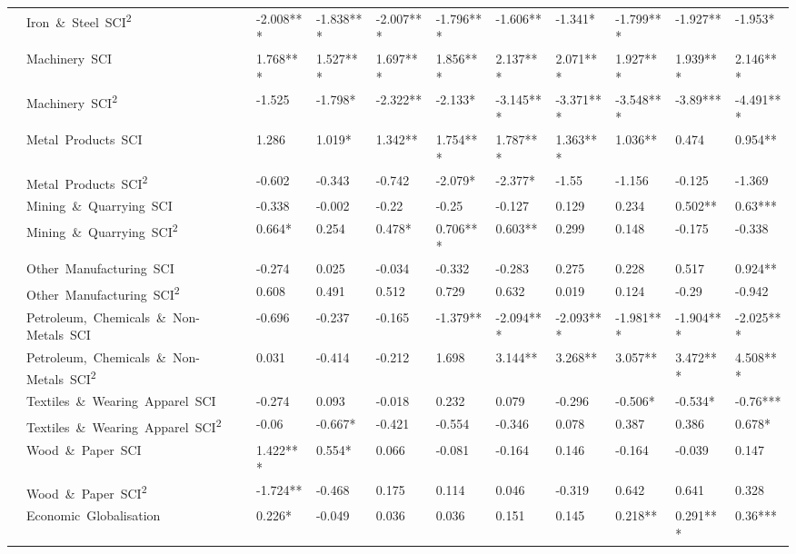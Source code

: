 \documentclass[10pt]{article}
\begin{document}
\begin{table}[ht]
\begin{adjustbox}{width=\textwidth,center}
\begin{tabular}{lllllllllll}
      & Iron\ \&\ Steel\ SCI\textsuperscript{2} & -2.008*** & -1.838*** & -2.007*** & -1.796*** & -1.606** & -1.341* & -1.799*** & -1.927** & -1.953* \\
      & Machinery\ SCI & 1.768*** & 1.527*** & 1.697*** & 1.856*** & 2.137*** & 2.071*** & 1.927*** & 1.939*** & 2.146*** \\
      & Machinery\ SCI\textsuperscript{2} & -1.525 & -1.798* & -2.322** & -2.133* & -3.145*** & -3.371*** & -3.548*** & -3.89*** & -4.491*** \\
      & Metal\ Products\ SCI & 1.286 & 1.019* & 1.342** & 1.754*** & 1.787*** & 1.363*** & 1.036** & 0.474 & 0.954** \\
      & Metal\ Products\ SCI\textsuperscript{2} & -0.602 & -0.343 & -0.742 & -2.079* & -2.377* & -1.55 & -1.156 & -0.125 & -1.369 \\
      & Mining\ \&\ Quarrying\ SCI & -0.338 & -0.002 & -0.22 & -0.25 & -0.127 & 0.129 & 0.234 & 0.502** & 0.63*** \\
      & Mining\ \&\ Quarrying\ SCI\textsuperscript{2} & 0.664* & 0.254 & 0.478* & 0.706*** & 0.603** & 0.299 & 0.148 & -0.175 & -0.338 \\
      & Other\ Manufacturing\ SCI & -0.274 & 0.025 & -0.034 & -0.332 & -0.283 & 0.275 & 0.228 & 0.517 & 0.924** \\
      & Other\ Manufacturing\ SCI\textsuperscript{2} & 0.608 & 0.491 & 0.512 & 0.729 & 0.632 & 0.019 & 0.124 & -0.29 & -0.942 \\
      & Petroleum,\ Chemicals\ \&\ Non-Metals\ SCI & -0.696 & -0.237 & -0.165 & -1.379** & -2.094*** & -2.093*** & -1.981*** & -1.904*** & -2.025*** \\
      & Petroleum,\ Chemicals\ \&\ Non-Metals\ SCI\textsuperscript{2} & 0.031 & -0.414 & -0.212 & 1.698 & 3.144** & 3.268** & 3.057** & 3.472*** & 4.508*** \\
      & Textiles\ \&\ Wearing\ Apparel\ SCI & -0.274 & 0.093 & -0.018 & 0.232 & 0.079 & -0.296 & -0.506* & -0.534* & -0.76*** \\
      & Textiles\ \&\ Wearing\ Apparel\ SCI\textsuperscript{2} & -0.06 & -0.667* & -0.421 & -0.554 & -0.346 & 0.078 & 0.387 & 0.386 & 0.678* \\
      & Wood\ \&\ Paper\ SCI & 1.422*** & 0.554* & 0.066 & -0.081 & -0.164 & 0.146 & -0.164 & -0.039 & 0.147 \\
      & Wood\ \&\ Paper\ SCI\textsuperscript{2} & -1.724** & -0.468 & 0.175 & 0.114 & 0.046 & -0.319 & 0.642 & 0.641 & 0.328 \\
      & Economic\ Globalisation & 0.226* & -0.049 & 0.036 & 0.036 & 0.151 & 0.145 & 0.218** & 0.291*** & 0.36*** \\

\end{tabular}
\end{adjustbox}
\end{table}
\end{document}
